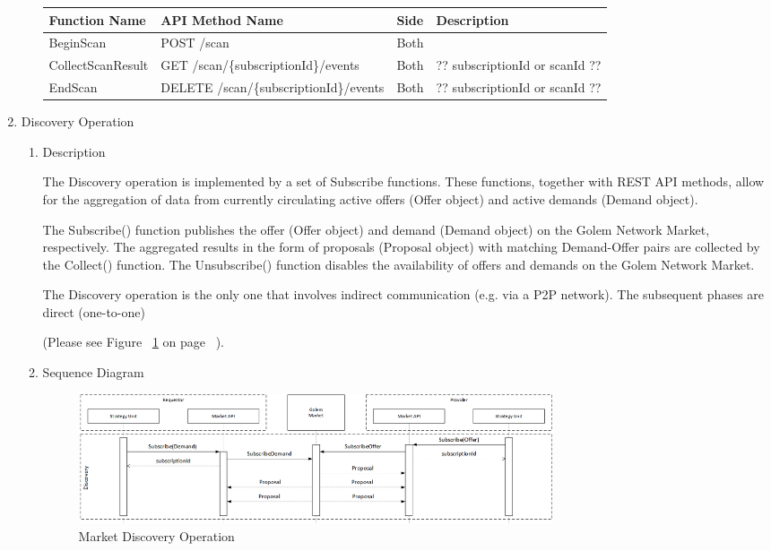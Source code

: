 \begin{enumerate}
\begin{enumerate}
\begin{center}
\begin{tabular}{|p{3cm}|p{7cm}|p{1.5cm}|p{4cm}|} 
\hline
\rowcolor{lightgray}	Function Name	& API Method Name	& 	Side	&	Description \\
\hline

BeginScan 				& POST /scan								&	Both	&	\\
\hline

CollectScanResult		& GET /scan/\{subscriptionId\}/events		&	Both 	& ?? subscriptionId or scanId ??	\\
\hline

EndScan 				& DELETE /scan/\{subscriptionId\}/events	&	Both 	& ?? subscriptionId or scanId ??	\\
\hline

\end{tabular}
\end{center}

\end{enumerate}

\break

\item  Discovery Operation

\begin{enumerate}

\item Description

The Discovery operation is implemented by a set of Subscribe functions. These functions, together with REST API methods, 
allow for the aggregation of data from currently circulating active offers (Offer object) and active demands (Demand object).

The Subscribe() function publishes the offer (Offer object) and demand (Demand object) on the Golem Network Market, respectively.
The aggregated results in the form of proposals (Proposal object) with matching Demand-Offer pairs are collected by the Collect() function.
The Unsubscribe() function disables the availability of offers and demands on the Golem Network Market.

The Discovery operation is the only one that involves indirect communication (e.g. via a P2P network).
The subsequent phases are direct (one-to-one)

(Please see Figure ~\ref{fig:MDO} on page ~\pageref{fig:MDO}).

\item Sequence Diagram

\begin{figure}[htbp]
    \centering
    \includegraphics[width=14cm,angle=0]{./diag/Sequence/MarketDiscovery-B-Sequence.png}
	\caption{Market Discovery Operation}
    \label{fig:MDO}
\end{figure}


\end{enumerate}
\end{enumerate}
